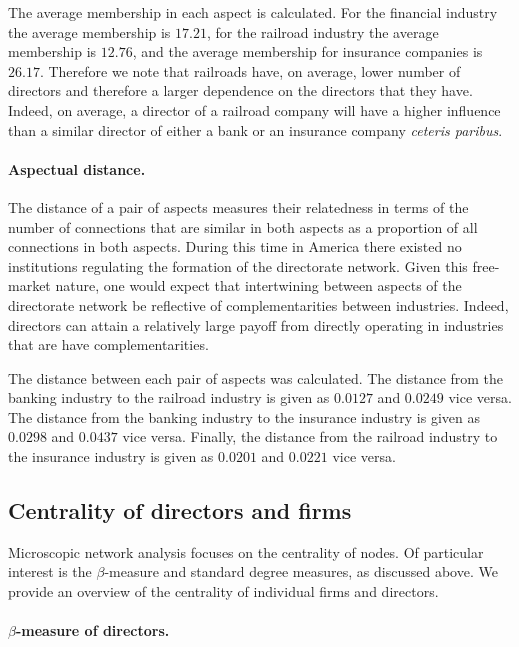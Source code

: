 The average membership in each aspect is calculated. For the financial industry the average membership is $17.21$, for the railroad industry the average membership is $12.76$, and the average membership for insurance companies is $26.17$. Therefore we note that railroads have, on average, lower number of directors and therefore a larger dependence on the directors that they have. Indeed, on average, a director of a railroad company will have a higher influence than a similar director of either a bank or an insurance company \emph{ceteris paribus}.

\paragraph{Aspectual distance.}

The distance of a pair of aspects measures their relatedness in terms of the number of connections that are similar in both aspects as a proportion of all connections in both aspects. During this time in America there existed no institutions regulating the formation of the directorate network. Given this free-market nature, one would expect that intertwining between aspects of the directorate network be reflective of complementarities between industries. Indeed, directors can attain a relatively large payoff from directly operating in industries that are have complementarities.

The distance between each pair of aspects was calculated. The distance from the banking industry to the railroad industry is given as $0.0127$ and $0.0249$ vice versa. The distance from the banking industry to the insurance industry is given as $0.0298$ and $0.0437$ vice versa. Finally, the distance from the railroad industry to the insurance industry is given as $0.0201$ and $0.0221$ vice versa.

\subsection{Centrality of directors and firms}

Microscopic network analysis focuses on the centrality of nodes. Of particular interest is the $\beta$-measure and standard degree measures, as discussed above. We provide an overview of the centrality of individual firms and directors.

\paragraph{$\beta$-measure of directors.}

